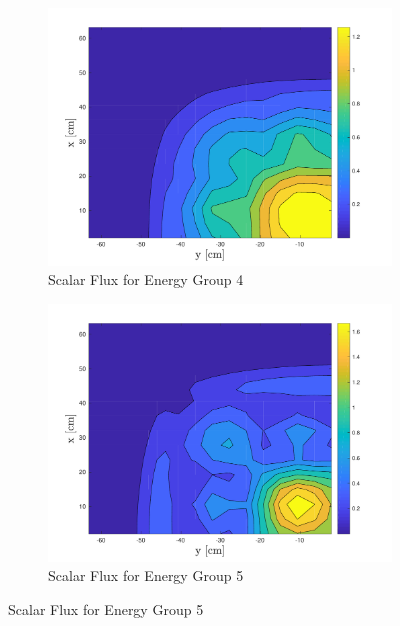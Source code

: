 \begin{figure}[!htbp]\ContinuedFloat
\centering
\begin{subfigure}[b]{0.75\textwidth}
        \includegraphics[width=\textwidth]{Figures/HigherDimEigen/AlphaScalarFluxRQ_g=4}
        \caption{Scalar Flux for Energy Group 4}
   \label{fig:2DScalarFluxAlpha4} 
\end{subfigure}

\begin{subfigure}[b]{0.75\textwidth}
        \includegraphics[width=\textwidth]{Figures/HigherDimEigen/AlphaScalarFluxRQ_g=5}
        \caption{Scalar Flux for Energy Group 5}
   \label{fig:2DScalarFluxAlpha5} 
\end{subfigure}
\end{figure}

